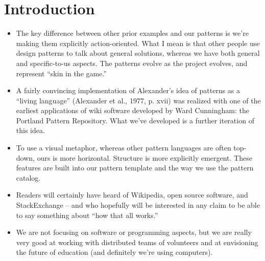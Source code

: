 \section{Introduction}

\begin{itemize}
\item The key difference between other prior examples and our
patterns is we're making them explicitly action-oriented.  What I mean
is that other people use design patterns to talk about general
solutions, whereas we have both general and specific-to-us aspects.
The patterns evolve as the project evolves, and represent ``skin in the game.''
\item A fairly convincing
implementation of Alexander’s idea of patterns as a “living language” (Alexander et
al., 1977, p. xvii) was realized with one of the earliest applications of wiki
software developed by Ward Cunningham: the Portland Pattern Repository.
What we've developed is a further iteration of this idea.
\item To use a visual metaphor, whereas other pattern languages are often top-down,
ours is more horizontal.  Structure is more explicitly emergent.  These features are built
into our pattern template and the way we use the pattern catalog.
\item Readers will certainly have heard of Wikipedia, open source
software, and StackExchange -- and who hopefully will be interested in
any claim to be able to say something about ``how that all works.''
\item We are not focusing on software or programming aspects, but we
are really very good at working with distributed teams of volunteers and
at envisioning the future of education (and definitely we're using
computers).
\end{itemize}